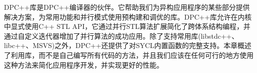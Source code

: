 
DPC++库是DPC++编译器的伙伴。它帮助我们为异构应用程序的某些部分提供解决方案，为常用功能和并行模式使用预构建和调优的库。DPC++库允许在内核中显式使用C++ STL API，它通过并行STL算法扩展简化了跨体系结构编程，并通过自定义迭代器增加了并行算法的成功应用。除了支持常用库(libstdc++、libc++、MSVS)之外，DPC++还提供了对SYCL内置函数的完整支持。本章概述了利用库，而不是自己编写所有代码的方法，并且我们应该在任何可行的地方使用这种方法来简化应用程序开发，并实现更好的性能。\par


\newpage